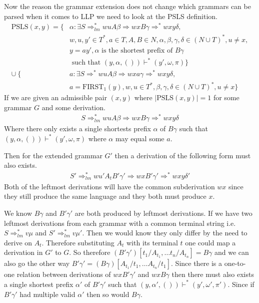 \documentclass[a4paper,12pt]{article}
\newcommand\PSLS{\text{PSLS}}
\theoremstyle{definition}
\begin{document}
Now the reason the grammar extension does not change which grammars can be parsed when it comes to LLP we need to look at the PSLS definition.
\begin{align*}
  \text{PSLS}(x, y) = \{ & \alpha : \exists S \Rightarrow^*_{lm} wuA\beta \Rightarrow wxB\gamma \Rightarrow^* wxy\delta, \\
  & w, u, y' \in T^*, a \in T, A, B \in N, \alpha, \beta, \gamma, \delta \in (N \cup T)^*, u \neq x, \\
  & y = ay', \alpha \text{ is the shortest prefix of } B\gamma \\ 
  & \text{ such that } (y, \alpha, ()) \vdash^* (y', \omega, \pi)\} \\
  \cup \: \{ & a : \exists S \Rightarrow^* wuA\beta \Rightarrow wxa\gamma \Rightarrow^* wxy\delta, \\
  & a = \text{FIRST}_1(y), w,u \in T^*, \beta, \gamma, \delta \in (N \cup T)^*, u \neq x \}
\end{align*}
If we are given an admissible pair $(x, y)$ where $|\PSLS(x, y)| = 1$ for some grammar $G$ and some derivation.
\begin{align*}
  S \Rightarrow^*_{lm} wuA\beta \Rightarrow wxB\gamma \Rightarrow^* wxy\delta
\end{align*}
Where there only exists a single shortests prefix $\alpha$ of $B\gamma$ such that $(y, \alpha, ()) \vdash^* (y', \omega, \pi)$ where $\alpha$ may equal some $a$.

Then for the extended grammar $G'$ then a derivation of the following form must also exists.
\begin{align*}
  S' \Rightarrow^*_{lm} wu'A_tB'\gamma' \Rightarrow wxB'\gamma' \Rightarrow^* wxy\delta'
\end{align*}
Both of the leftmost derivations will have the common subderivation $wx$ since they still produce the same language and they both must produce $x$. 

We know $B\gamma$ and $B'\gamma'$ are both produced by leftmost derivations. If we have two leftmost derivations from each grammar with a common terminal string i.e. $S \Rightarrow^*_{lm} v\mu$ and $S' \Rightarrow^*_{lm} v\mu'$. Then we would know they only differ by the need to derive on $A_t$. Therefore substituting $A_t$ with its terminal $t$ one could map a derivation in $G'$ to $G$. So therefore $(B'\gamma')[t_1/A_{t_1}, \dots t_n/A_{t_n}] = B\gamma$ and we can also go the other way $B'\gamma' = (B\gamma)[A_{t_1}/t_1, \dots A_{t_n}/t_1]$. Since there is a one-to-one relation between derivations of $wxB'\gamma'$ and $wxB\gamma$ then there must also exists a single shortest prefix $\alpha'$ of $B'\gamma'$ such that $(y, \alpha', ()) \vdash^* (y', \omega', \pi')$. Since if $B'\gamma'$ had multiple valid $\alpha'$ then so would $B\gamma$.
\end{document}
